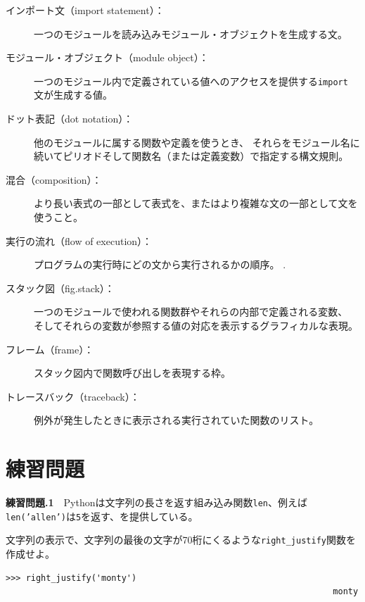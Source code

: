\documentclass[a4j,12pt,makeidx]{jbook}
\newcommand{\tp}{\thechapter}
\begin{document}
\begin{description}
\item[インポート文（import statement）：]一つのモジュールを読み込みモジュール・オブジェクトを生成する文。 

\item[モジュール・オブジェクト（module object）：] 一つのモジュール内で定義されている値へのアクセスを提供する{\tt import} 文が生成する値。

\item[ドット表記（dot notation）：]  他のモジュールに属する関数や定義を使うとき、
それらをモジュール名に続いてピリオドそして関数名（または定義変数）で指定する構文規則。

\item[混合（composition）：]より長い表式の一部として表式を、またはより複雑な文の一部として文を使うこと。 

\item[実行の流れ（flow of execution）：]プログラムの実行時にどの文から実行されるかの順序。 .

\item[スタック図（fig.stack）：]  一つのモジュールで使われる関数群やそれらの内部で定義される変数、
そしてそれらの変数が参照する値の対応を表示するグラフィカルな表現。

\item[フレーム（frame）：]スタック図内で関数呼び出しを表現する枠。  

\item[トレースバック（traceback）：]例外が発生したときに表示される実行されていた関数のリスト。

\end{description}

\section{練習問題}
\noindent
{\bf 練習問題\tp.1}　Pythonは文字列の長さを返す組み込み関数{\tt len}、例えば{\tt len('allen')}は{\tt 5}を返す、を提供している。\par
文字列の表示で、文字列の最後の文字が70桁にくるような{\tt right\_justify}関数を作成せよ。
\begin{verbatim}
>>> right_justify('monty')
                                                                 monty
\end{verbatim}  
\end{document}
